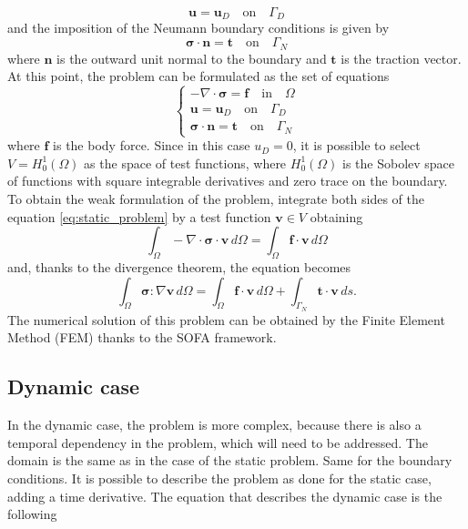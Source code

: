 \begin{equation}
    \bm{u} = \bm{u}_D \quad \text{on} \quad \Gamma_D
\end{equation}
and the imposition of the Neumann boundary conditions is given by
\begin{equation}
    \bm{\sigma} \cdot \bm{n} = \bm{t} \quad \text{on} \quad \Gamma_N
\end{equation}
where \( \bm{n} \) is the outward unit normal to the boundary and \( \bm{t} \) is the traction vector. 
At this point, the problem can be formulated as the set of equations
\begin{equation}
    \begin{cases}
        -\nabla \cdot \bm{\sigma} = \bm{f} \quad \text{in} \quad \Omega \\
        \bm{u} = \bm{u}_D \quad \text{on} \quad \Gamma_D \\
        \bm{\sigma} \cdot \bm{n} = \bm{t} \quad \text{on} \quad \Gamma_N
    \end{cases}
\label{eq:static_problem}
\end{equation}
where \( \bm{f} \) is the body force. 
Since in this case \(u_D = 0\), it is possible to select \(V = H^1_0(\Omega)\) as the space of test functions, where \(H^1_0(\Omega)\) is the Sobolev space of functions with square integrable derivatives and zero trace on the boundary. To obtain the weak formulation of the problem, integrate both sides of the equation \eqref{eq:static_problem} by a test function \( \bm{v} \in V \) obtaining 
\begin{equation}
    \int_{\Omega} -\nabla \cdot \bm{\sigma} \cdot \bm{v} \, d\Omega = \int_{\Omega} \bm{f} \cdot \bm{v} \, d\Omega
\end{equation}
and, thanks to the divergence theorem, the equation becomes
\begin{equation}
    \int_{\Omega} \bm{\sigma} : \nabla \bm{v} \, d\Omega = \int_{\Omega} \bm{f} \cdot \bm{v} \, d\Omega + \int_{\Gamma_N} \bm{t} \cdot \bm{v} \, ds.
\end{equation}
The numerical solution of this problem can be obtained by the Finite Element Method (FEM) thanks to the SOFA framework.

\subsection{Dynamic case}
In the dynamic case, the problem is more complex, because there is also a temporal dependency in the problem, which will need to be addressed. The domain is the same as in the case of the static problem. Same for the boundary conditions. It is possible to describe the problem as done for the static case, adding a time derivative.
The equation that describes the dynamic case is the following

         
